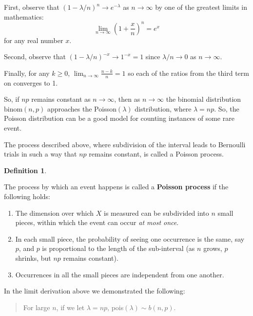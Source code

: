 \documentclass[
]{book}
\providecommand{\tightlist}{%
  \setlength{\itemsep}{0pt}\setlength{\parskip}{0pt}}
\theoremstyle{definition}
\newtheorem{definition}{Definition}[chapter]
\theoremstyle{definition}
\theoremstyle{definition}
\theoremstyle{definition}
\theoremstyle{remark}
\begin{document}
First, observe that \((1-\lambda/n)^n \to e^{-\lambda}\) as \(n \to \infty\) by one of the greatest limits in mathematics: \[\lim_{n \to \infty}\left(1+\frac{x}{n}\right)^n = e^x\] for any real number \(x\).

Second, observe that \((1-\lambda/n)^{-x} \to 1^{-x} = 1\) since \(\lambda/n \to 0\) as \(n \to \infty\).

Finally, for any \(k \geq 0\), \(\lim_{n \to \infty} \frac{n-k}{n} = 1\) so each of the ratios from the third term on converges to 1.

So, if \(np\) remains constant as \(n \to \infty\), then as \(n \to \infty\) the binomial distribution \(\text{binom}(n,p)\) approaches the Poisson\((\lambda)\) distribution, where \(\lambda = np\). So, the Poisson distribution can be a good model for counting instances of some rare event.

The process described above, where subdivision of the interval leads to Bernoulli trials in such a way that \(np\) remains constant, is called a Poisson process.

\begin{definition}
\protect\hypertarget{def:def-pois-process}{}\label{def:def-pois-process}

The process by which an event happens is called a \textbf{Poisson process} if the following holds:

\begin{enumerate}
\def\labelenumi{\arabic{enumi}.}
\tightlist
\item
  The dimension over which \(X\) is measured can be subdivided into \(n\) small pieces, within which the event can occur \emph{at most once}.
\item
  In each small piece, the probability of seeing one occurrence is the same, say \(p\), and \(p\) is proportional to the length of the sub-interval (as \(n\) grows, \(p\) shrinks, but \(np\) remains constant).
\item
  Occurrences in all the small pieces are independent from one another.
\end{enumerate}

\end{definition}

In the limit derivation above we demonstrated the following:

\begin{quote}
For large \(n\), if we let \(\lambda = np\), pois\((\lambda)\sim b(n,p)\).
\end{quote}
\end{document}
